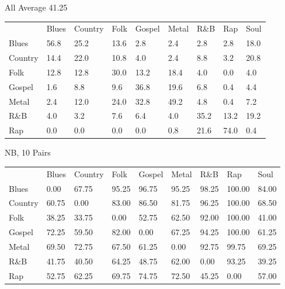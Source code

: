 \documentclass[a4paper,oneside]{article}
\begin{document}
All
Average 41.25
\begin{table}
\begin{tabular}{|l||*{8}{l|}} \hline
&Blues & Country & Folk & Gospel & Metal & R\&B & Rap & Soul \\ \hhline{|=||*{8}{=|}}
Blues & 56.8 & 25.2 & 13.6 & 2.8 & 2.4 & 2.8 & 2.8 & 18.0 \\ \hline
Country & 14.4 & 22.0 & 10.8 & 4.0 & 2.4 & 8.8 & 3.2 & 20.8 \\ \hline
Folk & 12.8 & 12.8 & 30.0 & 13.2 & 18.4 & 4.0 & 0.0 & 4.0 \\ \hline
Gospel & 1.6 & 8.8 & 9.6 & 36.8 & 19.6 & 6.8 & 0.4 & 4.4 \\ \hline
Metal & 2.4 & 12.0 & 24.0 & 32.8 & 49.2 & 4.8 & 0.4 & 7.2 \\ \hline
R\&B & 4.0 & 3.2 & 7.6 & 6.4 & 4.0 & 35.2 & 13.2 & 19.2 \\ \hline
Rap & 0.0 & 0.0 & 0.0 & 0.0 & 0.8 & 21.6 & 74.0 & 0.4 \\ \hline
\end{tabular}
\end{table}

NB, 10
Pairs
\begin{table}
\begin{tabular}{|l||*{8}{l|}} \hline
 & Blues & Country & Folk & Gospel & Metal & R\&B & Rap & Soul \\ \hhline{|=||*{8}{=|}}
Blues & 0.00 & 67.75 & 95.25 & 96.75 & 95.25 & 98.25 & 100.00 & 84.00 \\ \hline
Country & 60.75 & 0.00 & 83.00 & 86.50 & 81.75 & 96.25 & 100.00 & 68.50 \\ \hline
Folk & 38.25 & 33.75 & 0.00 & 52.75 & 62.50 & 92.00 & 100.00 & 41.00 \\ \hline
Gospel & 72.25 & 59.50 & 82.00 & 0.00 & 67.25 & 94.25 & 100.00 & 61.25 \\ \hline
Metal & 69.50 & 72.75 & 67.50 & 61.25 & 0.00 & 92.75 & 99.75 & 69.25 \\ \hline
R\&B & 41.75 & 40.50 & 64.25 & 48.75 & 62.00 & 0.00 & 93.25 & 39.25 \\ \hline
Rap & 52.75 & 62.25 & 69.75 & 74.75 & 72.50 & 45.25 & 0.00 & 57.00 \\ \hline
\end{tabular}
\end{table}
\end{document}
